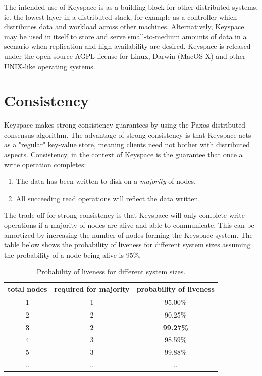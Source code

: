 \documentclass[12pt]{article}
\begin{document}
The intended use of Keyspace is as a building block for other distributed systems, ie. the lowest layer in a distributed stack, for example as a controller which distributes data and workload across other machines. Alternatively, Keyspace may be used in itself to store and serve small-to-medium amounts of data in a scenario when replication and high-availability are desired. Keyspace is released under the open-source AGPL license for Linux, Darwin (MacOS X) and other UNIX-like operating systems.

\section{ Consistency }

Keyspace makes strong consistency guarantees by using the Paxos distributed consensus algorithm. The advantage of strong consistency is that Keyspace acts as a "regular" key-value store, meaning clients need not bother with distributed aspects. Consistency, in the context of Keyspace is the guarantee that once a write operation completes:

\begin{enumerate}
\item The data has been written to disk on a \textit{majority} of nodes.
\item All succeeding read operations will reflect the data written.
\end{enumerate}

The trade-off for strong consistency is that Keyspace will only complete write operations if a majority of nodes are alive and able to communicate. This can be amortized by increasing the number of nodes forming the Keyspace system. The table below shows the probability of liveness for different system sizes assuming the probability of a node being alive is 95\%.

\begin{table}[h]
\begin{center}
\begin{tabular}{ | c | c | c | }
\hline
total nodes & required for majority & probability of liveness \\
\hline \hline
1 & 1 & 95.00\% \\ \hline
2 & 2 & 90.25\% \\ \hline
\textbf{3} & \textbf{2} & \textbf{99.27\%} \\ \hline
4 & 3 & 98.59\% \\ \hline
5 & 3 & 99.88\% \\ \hline
.. & .. & .. \\ \hline
\end{tabular}
\caption{ Probability of liveness for different system sizes. }
\end{center}
\end{table}
\end{document}
